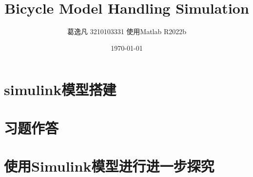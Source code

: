 \documentclass{article}
\title{Bicycle Model Handling Simulation}
\author{葛逸凡 3210103331 使用Matlab R2022b}
\date{\today}
\begin{document}
\maketitle

\section{simulink模型搭建}



\section{习题作答}



\section{使用Simulink模型进行进一步探究}


\end{document}
